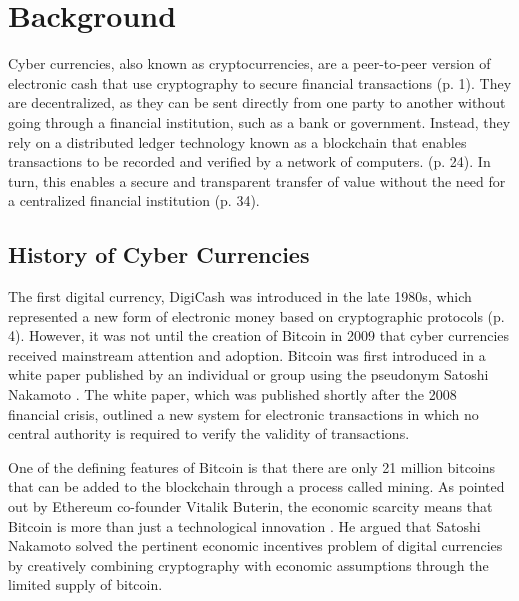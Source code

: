 \chapter{Background} \label{Chapter2}


Cyber currencies, also known as cryptocurrencies, are a peer-to-peer version of electronic cash that use cryptography to secure financial transactions \cite{nakamoto_bitcoin_nodate} (p. 1). They are decentralized, as they can be sent directly from one party to another without going through a financial institution, such as a bank or government. Instead, they rely on a distributed ledger technology known as a blockchain that enables transactions to be recorded and verified by a network of computers. \cite{universiti_utara_malaysia_robust_2018} (p. 24). In turn, this enables a secure and transparent transfer of value without the need for a centralized financial institution \cite{buterin_ethereum_nodate} (p. 34).

\section{History of Cyber Currencies}
The first digital currency, DigiCash was introduced in the late 1980s, which represented a new form of electronic money based on cryptographic protocols \cite{peters_trends_2015} (p. 4). However, it was not until the creation of Bitcoin in 2009 that cyber currencies received mainstream attention and adoption. Bitcoin was first introduced in a white paper published by an individual or group using the pseudonym Satoshi Nakamoto \cite{nakamoto_bitcoin_nodate}. The white paper, which was published shortly after the 2008 financial crisis, outlined a new system for electronic transactions in which no central authority is required to verify the validity of transactions.

One of the defining features of Bitcoin is that there are only 21 million bitcoins that can be added to the blockchain through a process called mining. As pointed out by Ethereum co-founder Vitalik Buterin, the economic scarcity means that Bitcoin is more than just a technological innovation \cite{ethereum_foundation_cryptoeconomics_2019}. He argued that Satoshi Nakamoto solved the pertinent economic incentives problem of digital currencies by creatively combining cryptography with economic assumptions through the limited supply of bitcoin.

